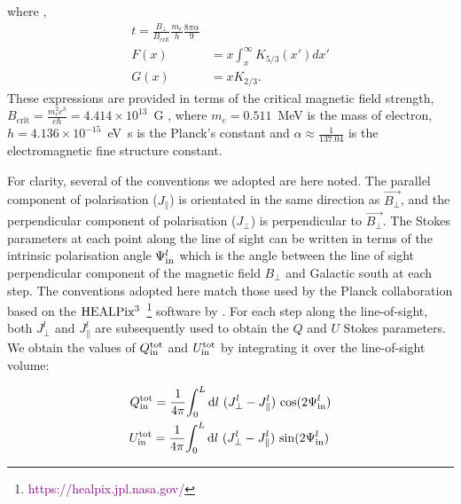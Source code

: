\documentclass[usenatbib]{mnras}
\newcommand{\Andrew}[1]{\textcolor{dg}{#1}}
\begin{document}
where ,
\begin{align}
t = \frac{B_{\perp}}{B_{\mathrm{crit}}}\frac{m_{e}}{h} \frac{8\pi \alpha}{9}
\\
F(x) &= x \int_x^\infty K_{5/3}(x') dx'\\
G(x) &= x K_{2/3}.
\end{align}
These expressions are provided in terms of the critical magnetic field strength, $B_{\mathrm{crit}} = \frac{m_e^2c^3}{e\hbar} = 4.414 \times 10^{13}$~G , where $m_e = 0.511$~MeV is the mass of electron, $h = 4.136 \times 10^{-15}$~eV~s is the Planck's constant and $\alpha \approx \frac{1}{137.04}$ is the electromagnetic fine structure constant.


For clarity, several of the conventions we adopted are here noted. The parallel component of polarisation (${J_{\parallel}}$) is orientated in the same direction as  $\vec{B_{\perp}}$, and the perpendicular component of polarisation (${J_{\perp}}$) is perpendicular to $\vec{B_{\perp}}$. The Stokes parameters at each point along the line of sight can be written in terms of the intrinsic polarisation angle $\Psi^l_{\rm in}$ which is the angle between the line of sight perpendicular component of the magnetic field $B_{\perp}$ and Galactic south at each step. The conventions adopted here match those used by the Planck collaboration \cite{Planck_XIX} based on the $\rm HEALPix^3$~\footnote{\textcolor{purple}{https://healpix.jpl.nasa.gov/}} software by \cite{Healpix_2005}. For each step along the line-of-sight, both  ${J_{\perp}^l}$ and ${J_{\parallel}^l}$ are subsequently used to obtain the $Q$ and $U$ Stokes parameters. We obtain the values of $Q^{\rm tot}_{\rm in}$ and $U^{\rm tot}_{\rm in}$ by integrating it over the line-of-sight volume:

\begin{eqnarray}
Q_{\rm in}^{\rm tot} = \frac{1}{4\pi} {\int_0^L \mathrm{d}l \ ({J_{\perp}^l} - J_{\parallel}^l) \ {\cos}(2\Psi^l_{\rm in}) } \\
U_{\rm in}^{\rm tot} =\frac{1}{4\pi} {\int_0^L \mathrm{d}l \ ({J_{\perp}^l} - J_{\parallel}^l) \ {\sin}(2\Psi^l_{\rm in})} \,
\end{eqnarray}
\end{document}
